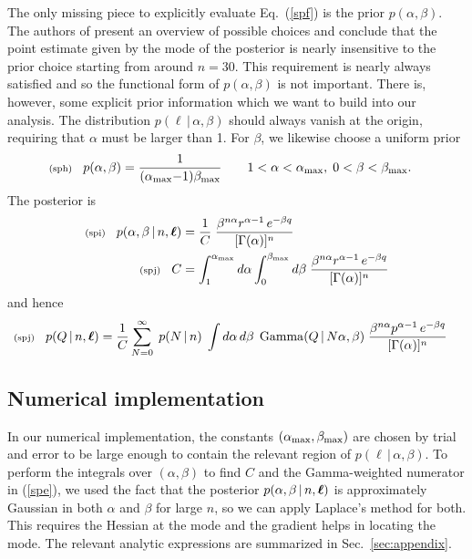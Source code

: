 \documentclass[11pt]{article}
\newcommand{\fred}[1]{\todo[color=orange!40,inline]{#1}} %
\newcommand{\lleq}[1]{\label{#1} }
\renewcommand{\lleq}[1]{\label{#1} {\scriptstyle {\rm (#1)}} \hspace*{2ex} }
\newcommand{\cond}{\,|\,}
\newcommand{\refeq}[1]{Eq.~(\ref{#1})}
\newcommand{\refsec}[1]{Sec.~\ref{sec:#1}}
\DeclareMathOperator{\GammaDist}{Gamma}
\newcommand{\Kalpha}{{K_\alpha}}
\newcommand{\Kbeta}{{K_\beta}}
\begin{document}
The only missing piece to explicitly evaluate \refeq{spf} is the prior
$p(\alpha,\beta)$. 
The authors of \cite{moala2013bayesian} present an overview of
possible choices and conclude that the point estimate given by the
mode of the posterior is nearly insensitive to the prior choice
starting from around $n = 30$. This requirement is nearly always
satisfied and so the functional form of $p(\alpha,\beta)$ is not
important. There is, however, some explicit prior information which we
want to build into our analysis. The distribution
$p(\ell \cond \alpha, \beta)$ should always vanish at the origin,
requiring that $\alpha$ must be larger than 1.  For $\beta$, we
likewise choose a uniform prior
\begin{align}
  \lleq{sph}
  p(\alpha,\beta) 
  &= \frac{1}{(\alpha_{\rm max}{-}1)\beta_{\rm max}}
  \qquad 1 < \alpha < \alpha_{\rm max},\; 0 < \beta < \beta_{\rm max}.
\end{align}
The posterior is
\begin{align}
  \lleq{spi}
  p(\alpha,\beta\cond n,\bml)
  &= \frac{1}{C}\; \frac{\beta^{n\alpha} r^{\alpha-1}\,e^{-\beta q}}{[\Gamma(\alpha)]^n}\\
  \lleq{spj}
  C &= \int_1^{\alpha_{\rm max}} d\alpha \int_0^{\beta_{\rm max}} d\beta\;
    \frac{\beta^{n\alpha} r^{\alpha-1}\,e^{-\beta q}}{[\Gamma(\alpha)]^n}
\end{align}
and hence
\begin{align}
  \lleq{spj}
  p(Q\cond n,\bml)
  &= \frac{1}{C} 
    \sum_{N=0}^\infty \;
    p(N\cond n)\;
    \int d\alpha\,d\beta\;
    \GammaDist(Q\cond N\alpha, \beta)\;
    \frac{\beta^{n\alpha} p^{\alpha-1}\,e^{-\beta q}}{[\Gamma(\alpha)]^n}
\end{align}


\subsection{Numerical implementation} \label{sec:numerical}

\fred{Editing will be done by Fred}

In our numerical implementation, the constants
$(\alpha_{\rm max}, \beta_{\rm max})$ are chosen by trial and error to
be large enough to contain the relevant region of
$p(\ell\cond \alpha,\beta)$.
% 
To perform the integrals over $(\alpha,\beta)$ to find $C$ and the
Gamma-weighted numerator in (\ref{spe}), we used the fact that the
posterior $p(\alpha,\beta \cond n,\bml)$ is approximately Gaussian in
both $\alpha$ and $\beta$ for large $n$, so we can apply Laplace's
method for both. This requires the Hessian at the mode and the
gradient helps in locating the mode. The relevant analytic expressions
are summarized in \refsec{appendix}.
\end{document}
